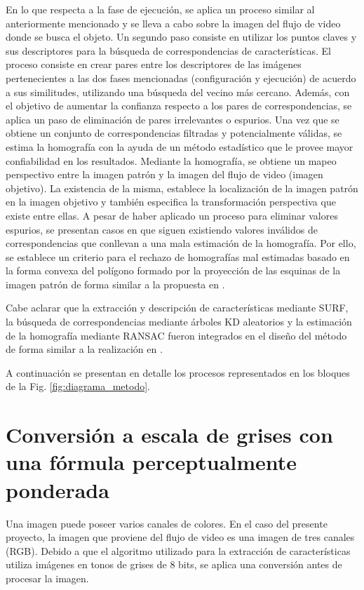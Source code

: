 En lo que respecta a la fase de ejecución, se aplica un proceso similar al anteriormente mencionado y se lleva a cabo sobre la imagen del flujo de video donde se busca el objeto. Un segundo paso consiste en utilizar los puntos claves y sus descriptores para la búsqueda de correspondencias de características. El proceso consiste en crear pares entre los descriptores de las imágenes pertenecientes a las dos fases mencionadas (configuración y ejecución) de acuerdo a sus similitudes, utilizando una búsqueda del vecino más cercano. Además, con el objetivo de aumentar la confianza respecto a los pares de correspondencias, se aplica un paso de eliminación de pares irrelevantes o espurios. Una vez que se obtiene un conjunto de correspondencias filtradas y potencialmente válidas, se estima la homografía con la ayuda de un método estadístico que le provee mayor confiabilidad en los resultados. Mediante la homografía, se obtiene un mapeo perspectivo entre la imagen patrón y la imagen del flujo de video (imagen objetivo). La existencia de la misma, establece la localización de la imagen patrón en la imagen objetivo y también especifica la transformación perspectiva que existe entre ellas. A pesar de haber aplicado un proceso para eliminar valores espurios, se presentan casos en que siguen existiendo valores inválidos de correspondencias que conllevan a una mala estimación de la homografía. Por ello, se establece un criterio para el rechazo de homografías mal estimadas basado en la forma convexa del polígono formado por la proyección de las esquinas de la imagen patrón de forma similar a la propuesta en \cite{BenhimaneNGGNM08}.

Cabe aclarar que la extracción y descripción de características mediante SURF, la búsqueda de correspondencias mediante árboles KD aleatorios y la estimación de la homografía mediante RANSAC fueron integrados en el diseño del método de forma similar a la realización en \cite{BenhimaneNGGNM08}.

A continuación se presentan en detalle los procesos representados en los bloques de la Fig. \ref{fig:diagrama_metodo}.
\section[Conversión a escala de grises]{Conversión a escala de grises con una fórmula perceptualmente ponderada}
\label{subsec:conver_escala_grises}
Una imagen puede poseer varios canales de colores. En el caso del presente proyecto, la imagen que proviene del flujo de video es una imagen de tres canales (RGB). Debido a que el algoritmo utilizado para la extracción de características utiliza imágenes en tonos de grises de 8 bits, se aplica una conversión antes de procesar la imagen.

